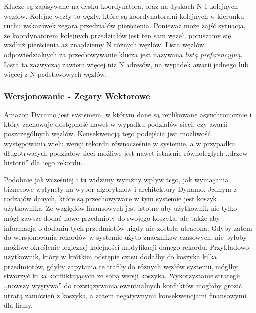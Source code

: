 Klucze są zapisywane na dysku koordynatora, oraz na dyskach N-1 kolejnych węzłów.
Kolejne węzły to węzły, które są koordynatorami kolejnych w kierunku ruchu wskazówek zegara przedziałów pierścienia.
Ponieważ może zajść sytuacja, że koordynatorem kolejnych przedziałów jest ten sam węzeł, poruszamy się wzdłuż pierścienia aż znajdziemy N różnych węzłów.
Lista węzłów odpowiedzialnych za przechowywanie klucza jest nazywana \emph{listą preferencyjną}.
Lista ta zazwyczaj zawiera więcej niż N adresów, na wypadek awarii jednego lub więcej z N podstawowych węzłów.

\subsubsection*{Wersjonowanie - Zegary Wektorowe}
\label{sec:dynamo-vector-clocks}

Amazon Dynamo jest systemem, w którym dane są replikowane asynchronicznie i który zachowuje dostępność nawet w wypadku podziałów sieci, czy awarii poszczególnych węzłów.
Konsekwencją tego podejścia jest możliwość występowania wielu wersji rekordu równocześnie w systemie, a w przypadku długotrwałych podziałów sieci możliwe jest nawet istnienie równoległych ,,drzew historii'' dla tego rekordu.

Podobnie jak wcześniej i tu widzimy wyraźny wpływ tego, jak wymagania biznesowe wpłynęły na wybór algorytmów i architektury Dynamo.
Jednym z rodzajów danych, które są przechowywane w tym systemie jest koszyk użytkownika.
Ze względów finansowych jest istotne aby użytkownik nie tylko mógł zawsze dodać nowe przedmioty do swojego koszyka, ale także aby informacja o dodaniu tych przedmiotów nigdy nie została utracona.
Gdyby zatem do wersjonowania rekordów w systemie użyto znaczników czasowych, nie byłoby możliwe określenie logicznej kolejności modyfikacji danego rekordu.
Przykładowo użytkownik, który w krótkim odstępie czasu dodałby do koszyka kilka przedmiotów, gdyby zapytania te trafiły do różnych węzłów systemu, mógłby stworzyć kilka konfliktujących ze sobą wersji koszyka.
Wykorzystanie strategii ,,nowszy wygrywa'' do rozwiązywania ewentualnych konfliktów mogłoby grozić utratą zamówień z koszyka, a zatem negatywnymi konsekwencjami finansowymi dla firmy.

